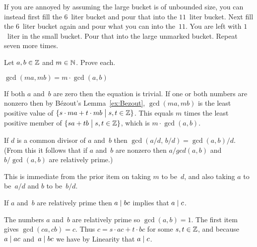 \documentclass{ibl}  %
\begin{document}
\begin{bezoutproof}
\begin{problem}
\begin{answer}
If you are annoyed by assuming the large bucket is of unbounded size, you
can instead
first fill the $6$~liter bucket and pour that into the $11$~liter bucket.
Next fill the $6$~liter bucket again and pour what you can into the~$11$.
You are left with $1$~liter in the small bucket.  
Pour that into the large unmarked bucket.
Repeat seven more times.    
\end{answer}
\end{problem}

\begin{problem}  \label{ex:EuclidsLemma}
Let $a,b\in\mathbb{Z}$ and $m\in\mathbb{N}$. 
Prove each.
\begin{exes}
\begin{exercise} 
  $\gcd(ma,mb)=m\cdot\gcd(a,b)$
\end{exercise}
\begin{answer}
  If both $a$ and~$b$ are zero then the equation is trivial.
  If one or both numbers are nonzero then by 
  B\'ezout's Lemma~\ref{ex:Bezout}, $\gcd(ma,mb)$ is the least
  positive value of $\{s\cdot ma+t\cdot mb \bigm| s,t\in\mathbb{Z}\}$.
  This equals $m$ times the least positive member of 
  $\{sa+tb \bigm| s,t\in\mathbb{Z}\}$, 
  which is $m\cdot\gcd(a,b)$.  
\end{answer}
\begin{exercise} 
  If $d$ is a common divisor of $a$ and~$b$ then 
  $\gcd(a/d,\,b/d)=\gcd(a,b)/d$.
  (From this it follows that 
  if $a$ and~$b$ are nonzero then $a/gcd(a,b)$ and $b/\gcd(a,b)$
  are relatively prime.)
\end{exercise}
\begin{answer}
  This is immediate from the prior item on taking $m$ to be~$d$, 
  and also taking $a$ to be~$a/d$ and $b$ to be~$b/d$.       
\end{answer}
\begin{exercise}   
  If $a$ and~$b$ are relatively prime then $a\mid bc$ implies that 
  $a\mid c$.
\end{exercise}
\begin{answer}
  The numbers $a$ and~$b$ are relatively prime so $\gcd(a,b)=1$.
  The first item gives $\gcd(ca,cb)=c$.
  Thus $c=s\cdot ac+t\cdot bc$ for some $s,t\in\mathbb{Z}$, and
  because $a\mid ac$ and~$a\mid bc$ we have by Linearity that
  $a\mid c$.
\end{answer}
\end{exes}
\end{problem}
\end{bezoutproof}
\end{document}
